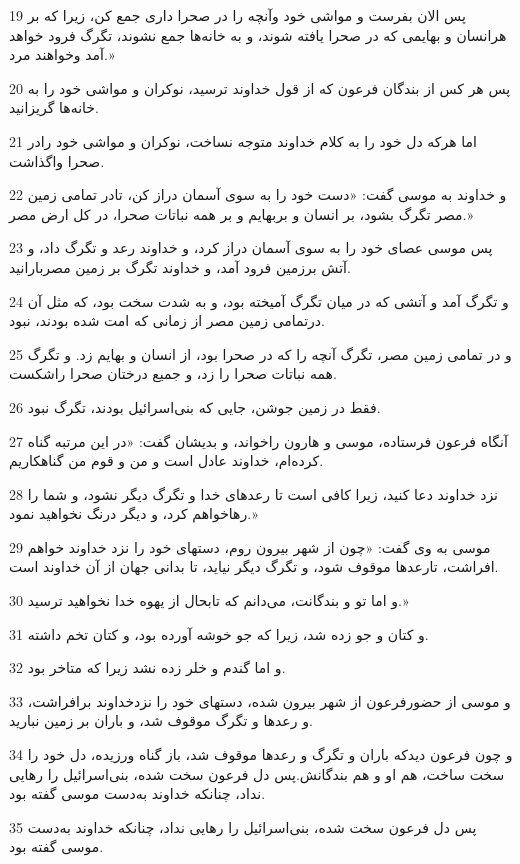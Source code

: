 \par 19 پس الان بفرست و مواشی خود وآنچه را در صحرا داری جمع کن، زیرا که بر هرانسان و بهایمی که در صحرا یافته شوند، و به خانه‌ها جمع نشوند، تگرگ فرود خواهد آمد وخواهند مرد.»
\par 20 پس هر کس از بندگان فرعون که از قول خداوند ترسید، نوکران و مواشی خود را به خانه‌ها گریزانید.
\par 21 اما هر‌که دل خود را به کلام خداوند متوجه نساخت، نوکران و مواشی خود رادر صحرا واگذاشت.
\par 22 و خداوند به موسی گفت: «دست خود را به سوی آسمان دراز کن، تادر تمامی زمین مصر تگرگ بشود، بر انسان و بربهایم و بر همه نباتات صحرا، در کل ارض مصر.»
\par 23 پس موسی عصای خود را به سوی آسمان دراز کرد، و خداوند رعد و تگرگ داد، و آتش برزمین فرود آمد، و خداوند تگرگ بر زمین مصربارانید.
\par 24 و تگرگ آمد و آتشی که در میان تگرگ آمیخته بود، و به شدت سخت بود، که مثل آن درتمامی زمین مصر از زمانی که امت شده بودند، نبود.
\par 25 و در تمامی زمین مصر، تگرگ آنچه را که در صحرا بود، از انسان و بهایم زد. و تگرگ همه نباتات صحرا را زد، و جمیع درختان صحرا راشکست.
\par 26 فقط در زمین جوشن، جایی که بنی‌اسرائیل بودند، تگرگ نبود.
\par 27 آنگاه فرعون فرستاده، موسی و هارون راخواند، و بدیشان گفت: «در این مرتبه گناه کرده‌ام، خداوند عادل است و من و قوم من گناهکاریم.
\par 28 نزد خداوند دعا کنید، زیرا کافی است تا رعدهای خدا و تگرگ دیگر نشود، و شما را رهاخواهم کرد، و دیگر درنگ نخواهید نمود.»
\par 29 موسی به وی گفت: «چون از شهر بیرون روم، دستهای خود را نزد خداوند خواهم افراشت، تارعدها موقوف شود، و تگرگ دیگر نیاید، تا بدانی جهان از آن خداوند است.
\par 30 و اما تو و بندگانت، می‌دانم که تابحال از یهوه خدا نخواهید ترسید.»
\par 31 و کتان و جو زده شد، زیرا که جو خوشه آورده بود، و کتان تخم داشته.
\par 32 و اما گندم و خلر زده نشد زیرا که متاخر بود.
\par 33 و موسی از حضورفرعون از شهر بیرون شده، دستهای خود را نزدخداوند برافراشت، و رعدها و تگرگ موقوف شد، و باران بر زمین نبارید.
\par 34 و چون فرعون دیدکه باران و تگرگ و رعدها موقوف شد، باز گناه ورزیده، دل خود را سخت ساخت، هم او و هم بندگانش.پس دل فرعون سخت شده، بنی‌اسرائیل را رهایی نداد، چنانکه خداوند به‌دست موسی گفته بود.
\par 35 پس دل فرعون سخت شده، بنی‌اسرائیل را رهایی نداد، چنانکه خداوند به‌دست موسی گفته بود.
 
